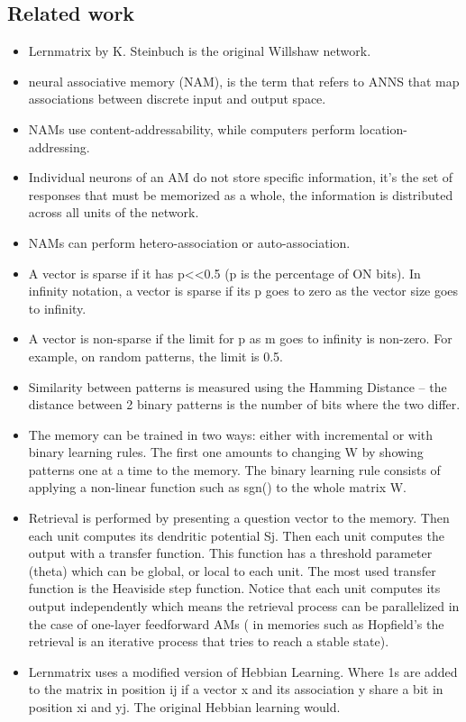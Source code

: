 \documentclass{article}
\begin{document}
\subsection{Related work}
\begin{itemize}
\item Lernmatrix by K. Steinbuch is the original Willshaw network.
\item neural associative memory (NAM), is the term that refers to ANNS that map associations between discrete input and output space. 
\item NAMs use content-addressability, while computers perform location-addressing.
\item Individual neurons of an AM do not store specific information, it's the set of responses that must be memorized as a whole, the information is distributed across all units of the network.
\item NAMs can perform hetero-association or auto-association.
\item A vector is sparse if it has p<<0.5 (p is the percentage of ON bits). In infinity notation, a vector is sparse if its p goes to zero as the vector size goes to infinity.
\item A vector is non-sparse if the limit for p as m goes to infinity is non-zero. For example, on random patterns, the limit is 0.5. 
\item Similarity between patterns is measured using the Hamming Distance -- the distance between 2 binary patterns is the number of bits where the two differ.
\item The memory can be trained in two ways: either with incremental or with binary learning rules. The first one amounts to changing W by showing patterns one at a time to the memory. The binary learning rule consists of applying a non-linear function such as sgn() to the whole matrix W.
\item Retrieval is performed by presenting a question vector to the memory. Then each unit computes its dendritic potential Sj. Then each unit computes the output with a transfer function. This function has a threshold parameter (theta) which can be global, or local to each unit. The most used transfer function is the Heaviside step function. Notice that each unit computes its output independently which means the retrieval process can be parallelized in the case of one-layer feedforward AMs ( in memories such as Hopfield's the retrieval is an iterative process that tries to reach a stable state).
\item Lernmatrix uses a modified version of Hebbian Learning. Where 1s are added to the matrix in position ij if a vector x and its association y share a bit in position xi and yj. The original Hebbian learning would.

\end{itemize}
\end{document}
